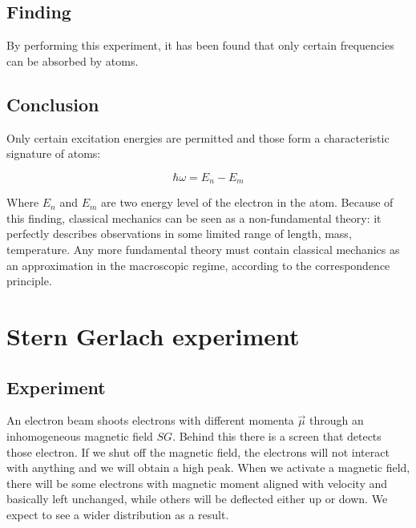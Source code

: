   \subsection{Finding}
  By performing this experiment, it has been found that only certain frequencies can be absorbed by atoms.

  \subsection{Conclusion}
  Only certain excitation energies are permitted and those form a characteristic signature of atoms:

  $$\hbar\omega = E_n-E_m$$

  Where $E_n$ and $E_m$ are two energy level of the electron in the atom.
  Because of this finding, classical mechanics can be seen as a non-fundamental theory: it perfectly describes observations in some limited range of length, mass, temperature.
  Any more fundamental theory must contain classical mechanics as an approximation in the macroscopic regime, according to the correspondence principle.

\section{Stern Gerlach experiment}

  \subsection{Experiment}
  An electron beam shoots electrons with different momenta $\vec{\mu}$ through an inhomogeneous magnetic field $SG$.
  Behind this there is a screen that detects those electron. If we shut off the magnetic field, the electrons will not interact with anything and we will obtain a high peak. When we activate a magnetic field, there will be some electrons with magnetic moment aligned with velocity and basically left unchanged, while others will be deflected either up or down. We expect to see a wider distribution as a result.


